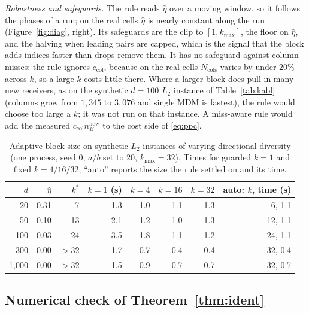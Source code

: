 \emph{Robustness and safeguards.} The rule reads $\hat\eta$ over a
moving window, so it follows the phases of a run; on the real cells
$\hat\eta$ is nearly constant along the run (Figure~\ref{fig:diag},
right). Its safeguards are
the clip to $[1,k_{\max}]$, the floor on $\hat\eta$, and the halving
when leading pairs are capped, which is the signal that the block adds
indices faster than drops remove them. It has no safeguard against
column misses: the rule ignores $c_{\mathrm{col}}$, because on the real
cells $N_{\mathrm{cols}}$ varies by under $20\%$ across $k$, so a large
$k$ costs little there. Where a larger block does pull in many new
receivers, as on the synthetic $d{=}100$ $L_2$ instance of
Table~\ref{tab:kabl} (columns grow from $1{,}345$ to $3{,}076$ and
single MDM is fastest), the rule would choose too large a $k$; it was not
run on that instance. A miss-aware rule would add the measured
$c_{\mathrm{col}}n^{\mathrm{new}}_B$ to the cost side of \eqref{eq:ppc}.

\begin{table}[t]\centering\scriptsize
\caption{Adaptive block size on synthetic $L_2$ instances of varying
directional diversity (one process, seed 0, $a/b$ set to $20$,
$k_{\max}=32$). Times for guarded $k{=}1$ and fixed $k=4/16/32$; ``auto''
reports the size the rule settled on and its time.}\label{tab:adaptive}
\begin{tabular}{rrrrrrrr}\toprule
$d$ & $\hat\eta$ & $k^*$ & $k{=}1$ (s) & $k{=}4$ & $k{=}16$ & $k{=}32$ & auto: $k$, time (s) \\\midrule
20 & 0.31 & 7 & 1.3 & 1.0 & 1.1 & 1.3 & 6, 1.1 \\
50 & 0.10 & 13 & 2.1 & 1.2 & 1.0 & 1.3 & 12, 1.1 \\
100 & 0.03 & 24 & 3.5 & 1.8 & 1.1 & 1.2 & 24, 1.1 \\
300 & 0.00 & $>32$ & 1.7 & 0.7 & 0.4 & 0.4 & 32, 0.4 \\
1,000 & 0.00 & $>32$ & 1.5 & 0.9 & 0.7 & 0.7 & 32, 0.7 \\
\bottomrule\end{tabular}\end{table}

\subsection{Numerical check of Theorem~\ref{thm:ident}}\label{sec:ident-check}

